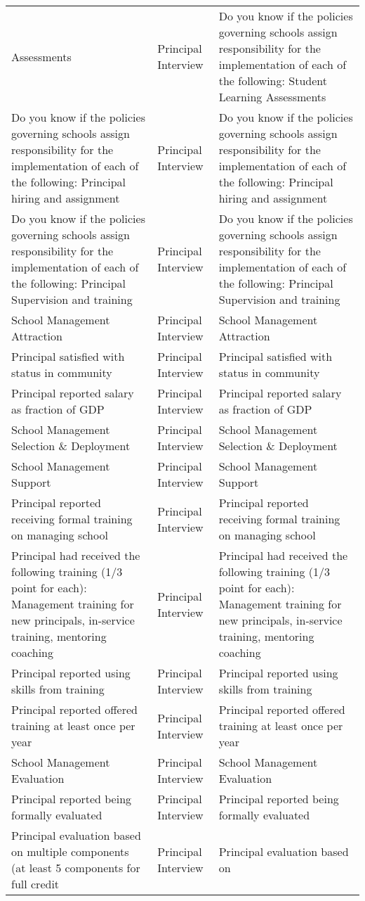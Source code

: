 \documentclass[]{article}
\begin{document}
\begin{longtable}[]{@{}lll@{}}
Assessments & Principal Interview & Do you know if the policies
governing schools assign responsibility for the implementation of each
of the following: Student Learning Assessments\tabularnewline
Do you know if the policies governing schools assign responsibility for
the implementation of each of the following: Principal hiring and
assignment & Principal Interview & Do you know if the policies governing
schools assign responsibility for the implementation of each of the
following: Principal hiring and assignment\tabularnewline
Do you know if the policies governing schools assign responsibility for
the implementation of each of the following: Principal Supervision and
training & Principal Interview & Do you know if the policies governing
schools assign responsibility for the implementation of each of the
following: Principal Supervision and training\tabularnewline
School Management Attraction & Principal Interview & School Management
Attraction\tabularnewline
Principal satisfied with status in community & Principal Interview &
Principal satisfied with status in community\tabularnewline
Principal reported salary as fraction of GDP & Principal Interview &
Principal reported salary as fraction of GDP\tabularnewline
School Management Selection \& Deployment & Principal Interview & School
Management Selection \& Deployment\tabularnewline
School Management Support & Principal Interview & School Management
Support\tabularnewline
Principal reported receiving formal training on managing school &
Principal Interview & Principal reported receiving formal training on
managing school\tabularnewline
Principal had received the following training (1/3 point for each):
Management training for new principals, in-service training, mentoring
coaching & Principal Interview & Principal had received the following
training (1/3 point for each): Management training for new principals,
in-service training, mentoring coaching\tabularnewline
Principal reported using skills from training & Principal Interview &
Principal reported using skills from training\tabularnewline
Principal reported offered training at least once per year & Principal
Interview & Principal reported offered training at least once per
year\tabularnewline
School Management Evaluation & Principal Interview & School Management
Evaluation\tabularnewline
Principal reported being formally evaluated & Principal Interview &
Principal reported being formally evaluated\tabularnewline
Principal evaluation based on multiple components (at least 5 components
for full credit & Principal Interview & Principal evaluation based on

\end{longtable}
\end{document}
